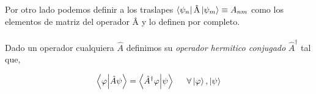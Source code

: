 Por otro lado podemos definir a los traslapes $ \bra{\psi_{n}}{\text{\^{A}}}\ket{\psi_{m}}\equiv A_{nm} $ como los elementos de matriz del operador \^{A} y lo definen por completo.\\\\
Dado un operador cualquiera $\hat{A}$ definimos su \emph{operador hermitico conjugado} $\hat{A}^{\dagger}$ tal que,

\begin{equation*}
    \bra{\varphi}\ket{\hat{A}\psi}=\bra{\hat{A}^{\dagger}\varphi}\ket{\psi} \hspace{0.5cm} \forall \ket{\varphi}, \ket{\psi}  
\end{equation*} 


